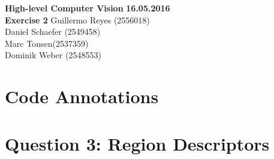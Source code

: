 \documentclass[12pt]{article}
\begin{document}

\noindent
{\Large \textbf{High-level Computer Vision}} \hfill \textbf{16.05.2016}\\
{\Large \textbf{Exercise 2}} 
\raggedleft \hfill Guillermo Reyes (2556018)\\
\hfill Daniel Schaefer (2549458)\\
\hfill Marc Tonsen(2537359)\\
\hfill Dominik Weber (2548553)\\

\raggedright


\section*{Code Annotations}




\section*{Question 3: Region Descriptors}
\end{document}
